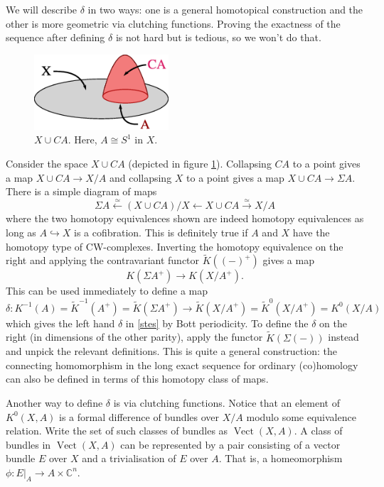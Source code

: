 \documentclass[a4paper,10pt]{article}
\theoremstyle{plain}%
\theoremstyle{definition}
\theoremstyle{remark}
\newcommand{\CC}{\mathbb{C}}
\newcommand{\into}{\hookrightarrow}
\newcommand{\xto}[1]{\xrightarrow{#1}}
\newcommand{\xot}[1]{\xleftarrow{#1}}
\newcommand{\ot}{\leftarrow}
\DeclareMathOperator{\Vect}{Vect}
\begin{document}
We will describe $\delta$ in two ways: one is a general homotopical
construction and the other is more geometric via clutching
functions. Proving the exactness of the sequence after defining
$\delta$ is not hard but is tedious, so we won't do that.

\begin{figure}
  \centering
  \label{xcupca}
  \includegraphics[width=5cm]{img/cone-on-A}
  \caption{$X \cup CA$. Here, $A \cong S^1$ in $X$.}
\end{figure}

Consider the space $X \cup CA$ (depicted in figure
\ref{xcupca}). Collapsing $CA$ to a point gives a map $X\cup CA \to
X/A$ and collapsing $X$ to a point gives a map $X\cup CA \to \Sigma
A$. There is a simple diagram of maps
\begin{equation*}
  \Sigma A \xot{\simeq} (X\cup CA) / X \ot X\cup CA \xto{\simeq} X/A
\end{equation*}
where the two homotopy equivalences shown are indeed homotopy
equivalences as long as $A \into X$ is a cofibration. This is
definitely true if $A$ and $X$ have the homotopy type of
CW-complexes. Inverting the homotopy equivalence on the right and
applying the contravariant functor $\tilde{K}((-)^+)$ gives a map
\begin{equation*}
  K(\Sigma A^+) \to K(X/A^+).
\end{equation*}
This can be used immediately to define a map
\begin{equation*}
  \delta: K^{-1}(A) = \tilde{K}^{-1}(A^+) = \tilde{K}(\Sigma A^+) \to
  \tilde{K}(X/A^+) = \tilde{K}^0(X/A^+) = K^0(X/A)
\end{equation*}
which gives the left hand $\delta$ in \eqref{stes} by Bott
periodicity. To define the $\delta$ on the right (in dimensions of the
other parity), apply the functor $\tilde{K}(\Sigma (-))$ instead and
unpick the relevant definitions. This is quite a general construction:
the connecting homomorphism in the long exact sequence for ordinary
(co)homology can also be defined in terms of this homotopy class of
maps.

Another way to define $\delta$ is via clutching functions. Notice that
an element of $K^0(X,A)$ is a formal difference of bundles over $X/A$
modulo some equivalence relation. Write the set of such classes of
bundles as $\Vect(X,A)$. A class of bundles in $\Vect(X,A)$ can be
represented by a pair consisting of a vector bundle $E$ over $X$ and a
trivialisation of $E$ over $A$. That is, a homeomorphism $\phi:
E|_A\to A\times \CC^n$.
\end{document}
